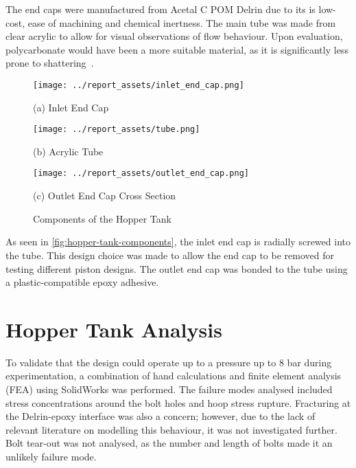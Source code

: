 The end caps were manufactured from Acetal C POM Delrin due to its is low-cost, ease of machining and chemical inertness. The main tube was made from clear acrylic to allow for visual observations of flow behaviour. Upon evaluation, polycarbonate would have been a more suitable material, as it is significantly less prone to shattering~\cite{SADEGHIESFAHLANI2021e06856}.
\begin{figure}[htbp]
    \centering

    \begin{minipage}{0.3\textwidth}
        \centering
        \texttt{[image: ../report\_assets/inlet\_end\_cap.png]}
        \caption*{(a) Inlet End Cap}
    \end{minipage}
    \hfill
    \begin{minipage}{0.3\textwidth}
        \centering
        \texttt{[image: ../report\_assets/tube.png]}
        \caption*{(b) Acrylic Tube}
    \end{minipage}
    \hfill
    \begin{minipage}{0.3\textwidth}
        \centering
        \texttt{[image: ../report\_assets/outlet\_end\_cap.png]}
        \caption*{(c) Outlet End Cap Cross Section}
    \end{minipage}
    \caption{Components of the Hopper Tank}\label{fig:hopper-tank-components}
\end{figure}
As seen in \autoref{fig:hopper-tank-components}, the inlet end cap is radially screwed into the tube. This design choice was made to allow the end cap to be removed for testing different piston designs. The outlet end cap was bonded to the tube using a plastic-compatible epoxy adhesive.

\section{Hopper Tank Analysis}\label{sec:tank-fea-setup}
To validate that the design could operate up to a pressure up to 8 bar during experimentation, a combination of hand calculations and finite element analysis (FEA) using SolidWorks was performed. The failure modes analysed included stress concentrations around the bolt holes and hoop stress rupture. Fracturing at the Delrin-epoxy interface was also a concern; however, due to the lack of relevant literature on modelling this behaviour, it was not investigated further. Bolt tear-out was not analysed, as the number and length of bolts made it an unlikely failure mode.

